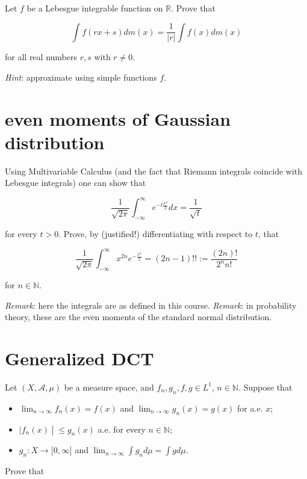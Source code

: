 Let \(f\) be a Lebesgue integrable function on \(\mathbb{R}\). Prove that

\[\int f(rx + s) dm(x) = \frac{1}{|r|}\int f(x) dm(x)\]

for all real numbers \(r,s\) with \(r \neq 0\).

\emph{Hint}: approximate using simple functions \(f\).

\section{even moments of Gaussian distribution}\label{even-moments-of-gaussian-distribution}

Using Multivariable Calculus (and the fact that Riemann integrals coincide with Lebesgue integrals) one can show that

\[\frac{1}{\sqrt{2\pi}}\int_{- \infty}^{\infty}e^{- t\frac{x^{2}}{2}} dx = \frac{1}{\sqrt{t}}\]

for every \(t > 0\). Prove, by (justified!) differentiating with respect to \(t\), that

\[\frac{1}{\sqrt{2\pi}}\int_{- \infty}^{\infty}x^{2n}e^{- \frac{x^{2}}{2}} = (2n - 1)!! := \frac{(2n)!}{2^{n}n!}\]

for \(n \in \mathbb{N}\).

\emph{Remark}: here the integrals are as defined in this course. \emph{Remark}: in probability theory, these are the even moments of the standard normal distribution.

\section{Generalized DCT}\label{generalized-dct}

Let \((X,\mathcal{A},\mu)\) be a measure space, and \(f_{n},g_{n},f,g \in L^{1}\), \(n \in \mathbb{N}\). Suppose that

\begin{itemize}
\item
  \(\lim_{n\rightarrow\infty}f_{n}(x) = f(x)\) and \(\lim_{n\rightarrow\infty}g_{n}(x) = g(x)\) for a.e. \(x\);
\item
  \(\left. |f_{n}(x) \middle| \leq g_{n}(x) \right.\) a.e. for every \(n \in \mathbb{N}\);
\item
  \(g_{n}:X\rightarrow\lbrack 0,\infty\rbrack\) and \(\lim_{n\rightarrow\infty}\int g_{n} d\mu = \int g d\mu\).
\end{itemize}

Prove that

